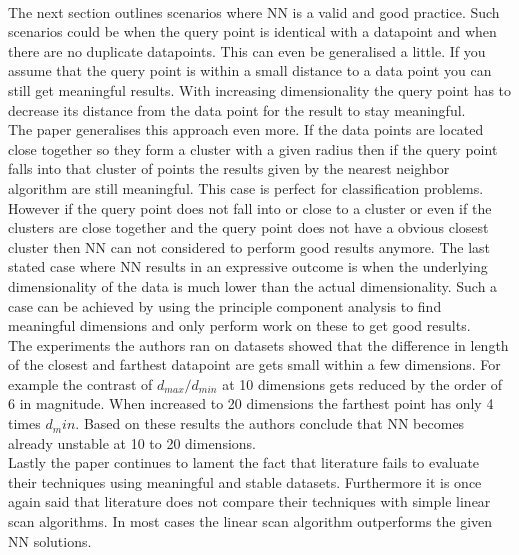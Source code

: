 \documentclass[a4paper,psfig,subfigure,epsfig,fleqn,amssmb,float,caption,fontenc,ausarbeitung]{article}
\begin{document}
\paragraph{}

The next section outlines scenarios where NN is a valid and good practice. Such scenarios could be when the query point is identical with a datapoint and when there are no duplicate datapoints. This can even be generalised a little. If you assume that the query point is within a small distance to a data point you can still get meaningful results. With increasing dimensionality the query point has to decrease its distance from the data point for the result to stay meaningful. \\
The paper generalises this approach even more. If the data points are located close together so they form a cluster with a given radius then if the query point falls into that cluster of points the results given by the nearest neighbor algorithm are still meaningful. This case is perfect for classification problems. However if the query point does not fall into or close to a cluster or even if the clusters are close together and the query point does not have a obvious closest cluster then NN can not considered to perform good results anymore.
The last stated case where NN results in an expressive outcome is when the underlying dimensionality of the data is much lower than the actual dimensionality. Such a case can be achieved by using the principle component analysis to find meaningful dimensions and only perform work on these to get good results. \\
The experiments the authors ran on datasets showed that the difference in length of the closest and farthest datapoint are gets small within a few dimensions. For example the contrast of $ d_{max} / d_{min} $ at 10 dimensions gets reduced by the order of 6 in magnitude. When increased to 20 dimensions the farthest point has only 4 times $ d_min $. Based on these results the authors conclude that NN becomes already unstable at 10 to 20 dimensions.\\
Lastly the paper continues to lament the fact that literature fails to evaluate their techniques using meaningful and stable datasets. Furthermore it is once again said that literature does not compare their techniques with simple linear scan algorithms. In most cases the linear scan algorithm outperforms the given NN solutions.



\fontsize{9}{10pt}


\end{document}
